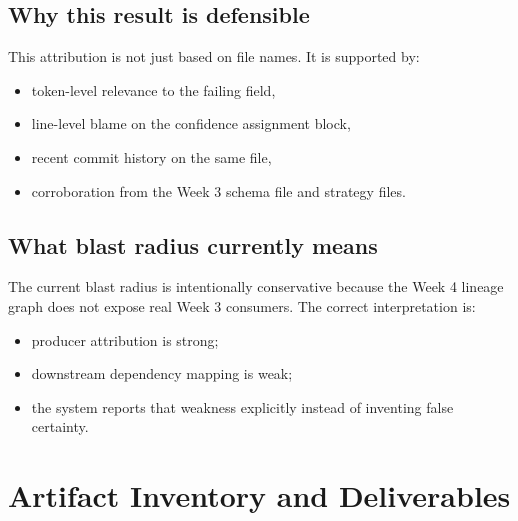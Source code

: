 \documentclass[11pt]{report}
\begin{document}
\section{Why this result is defensible}
This attribution is not just based on file names. It is supported by:

\begin{itemize}[leftmargin=1.5em]
  \item token-level relevance to the failing field,
  \item line-level blame on the confidence assignment block,
  \item recent commit history on the same file,
  \item corroboration from the Week 3 schema file and strategy files.
\end{itemize}

\section{What blast radius currently means}
The current blast radius is intentionally conservative because the Week 4 lineage graph does not expose real Week 3 consumers. The correct interpretation is:

\begin{itemize}[leftmargin=1.5em]
  \item producer attribution is strong;
  \item downstream dependency mapping is weak;
  \item the system reports that weakness explicitly instead of inventing false certainty.
\end{itemize}

\clearpage
\chapter{Artifact Inventory and Deliverables}
\end{document}
